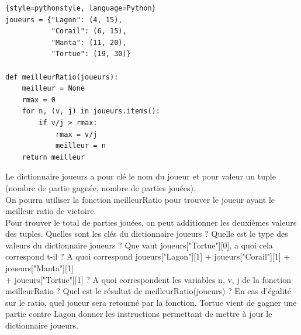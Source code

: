 \begin{Exercise}[title={Rappels sur les dictionnaires}]
\begin{lstlisting}{style=pythonstyle, language=Python}
joueurs = {"Lagon": (4, 15),
           "Corail": (6, 15),
           "Manta": (11, 20),
           "Tortue": (19, 30)}

def meilleurRatio(joueurs):
    meilleur = None
    rmax = 0
    for n, (v, j) in joueurs.items():
        if v/j > rmax:
            rmax = v/j
            meilleur = n
    return meilleur            
\end{lstlisting}

Le dictionnaire joueurs a pour clé le nom du joueur et pour valeur un tuple (nombre de partie gagnée, nombre de parties jouées).\\
On pourra utiliser la fonction meilleurRatio pour trouver le joueur ayant le meilleur ratio de victoire.\\
Pour trouver le total de parties jouées, on peut additionner les deuxièmes valeurs des tuples.
\Question Quelles sont les clés du dictionnaire joueurs ?
\Question Quelle est le type des valeurs du dictionnaire joueurs ?
\Question Que vaut joueurs["Tortue"][0], a quoi cela correspond t-il ?
\Question A quoi correspond joueurs["Lagon"][1] + joueurs["Corail"][1] + joueurs["Manta"][1] \\ + joueurs["Tortue"][1] ?
\Question A quoi correspondent les variables n, v, j de la fonction meilleurRatio ?
\Question Quel est le résultat de meilleurRatio(joueurs) ?
\Question En cas d'égalité sur le ratio, quel joueur sera retourné par la fonction.
\Question Tortue vient de gagner une partie contre Lagon donner les instructions permettant de mettre à jour le dictionnaire joueurs.
\end{Exercise}

\newpage




